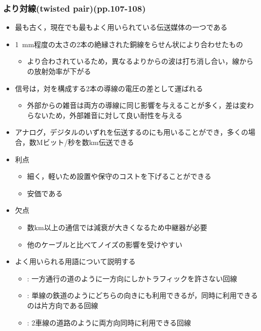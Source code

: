 \documentclass[a4paper]{ltjsarticle}
\begin{document}
		\subsubsection{より対線(twisted pair)(pp.107-108)}
			\begin{itemize}
				\item 最も古く，現在でも最もよく用いられている伝送媒体の一つである
				\item \SI{1}{mm}程度の太さの2本の絶縁された銅線をらせん状により合わせたもの
				\begin{itemize}
					\item より合わされているため，異なるよりからの波は打ち消し合い，線からの放射効率が下がる
				\end{itemize}
				\item 信号は，対を構成する2本の導線の電圧の差として運ばれる
				\begin{itemize}
					\item 外部からの雑音は両方の導線に同じ影響を与えることが多く，差は変わらないため，外部雑音に対して良い耐性を与える
				\end{itemize}
				\item アナログ，デジタルのいずれを伝送するのにも用いることができ，多くの場合，数Mビット/秒を数km伝送できる
				\item 利点
				\begin{itemize}
					\item 細く，軽いため設置や保守のコストを下げることができる
					\item 安価である
				\end{itemize}
				\item 欠点
				\begin{itemize}
					\item 数km以上の通信では減衰が大きくなるため中継器が必要
					\item 他のケーブルと比べてノイズの影響を受けやすい
				\end{itemize}
				\item よく用いられる用語について説明する
				\begin{itemize}
					\item {} : 一方通行の道のように一方向にしかトラフィックを許さない回線
					\item {} : 単線の鉄道のようにどちらの向きにも利用できるが，同時に利用できるのは片方向である回線
					\item {} : 2車線の道路のように両方向同時に利用できる回線

\end{itemize}
\end{itemize}
\end{document}
